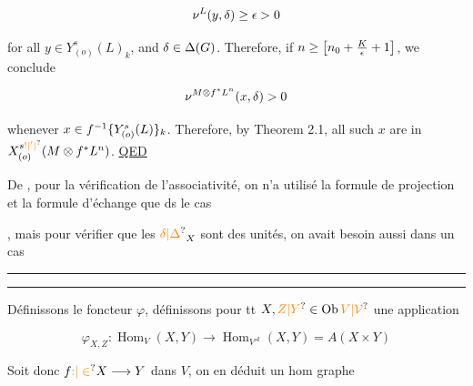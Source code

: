 \[
\nu^L(y,\delta)\geq\epsilon>0
\]

for all $y\in Y^s_{(o)}(L)_k$, and $\delta\in\Delta(G)$. Therefore, if $n\geq\left[n_0+\frac{K}{\epsilon}+1\right]$, we conclude

\[
\nu^{M\otimes f^*L^n}(x,\delta)>0
\]

whenever $x\in f^{-1}\{Y^s_{(o)}(L)\}_k$. Therefore, by Theorem 2.1, all such $x$ are in $X^{s\unsure{{}!|{}'|{}}}_{(o)}(M\handwritten{\otimes} f^*L^n)$. \uline{QED}

De , pour la  vérification de l'associativité, on n'a utilisé la formule de projection et la formule d'échange que ds le cas


, mais pour vérifier que les $\unsure{\delta|\Delta}_X$ sont des unités, on  avait besoin aussi dans un cas


\noindent\rule{2.7cm}{0.3pt}\par\nobreak\vspace{-0.8\baselineskip}\noindent\rule{3cm}{0.3pt}

Définissons le foncteur $\varphi$,  définissons pour tt $X,\unsure{Z|Y}\in\mathrm{Ob}\,\unsure{V|\mathcal V}$ une application

\[
\varphi_{X,Z}:\operatorname{Hom}_{V}(X,Y)\longrightarrow\operatorname{Hom}_{V^{\mathcal A}}(X,Y)=A(X\times Y)
\]

Soit donc $f\unsure{{:}|\in}X\longrightarrow Y$ dans $V$, on en déduit un hom graphe


